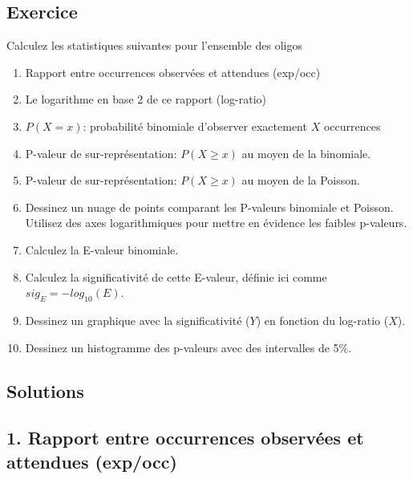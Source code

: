 \documentclass[]{article}
\newenvironment{Shaded}{\begin{snugshade}}{\end{snugshade}}
\newcommand{\StringTok}[1]{\textcolor[rgb]{0.80,0.58,0.58}{#1}}
\newcommand{\OperatorTok}[1]{\textcolor[rgb]{0.94,0.94,0.82}{#1}}
\newcommand{\NormalTok}[1]{\textcolor[rgb]{0.80,0.80,0.80}{#1}}
\begin{document}
\subsection{Exercice}\label{exercice-1}

Calculez les statistiques suivantes pour l'ensemble des oligos

\begin{enumerate}
\def\labelenumi{\arabic{enumi}.}
\item
  Rapport entre occurrences observées et attendues (exp/occ)
\item
  Le logarithme en base 2 de ce rapport (log-ratio)
\item
  \(P(X= x)\): probabilité binomiale d'observer exactement \(X\)
  occurrences
\item
  P-valeur de sur-représentation: \(P(X \ge x)\) au moyen de la
  binomiale.
\item
  P-valeur de sur-représentation: \(P(X \ge x)\) au moyen de la Poisson.
\item
  Dessinez un nuage de points comparant les P-valeurs binomiale et
  Poisson. Utilisez des axes logarithmiques pour mettre en évidence les
  faibles p-valeurs.
\item
  Calculez la E-valeur binomiale.
\item
  Calculez la significativité de cette E-valeur, définie ici comme
  \(sig_{E} = -log_{10}(E)\).
\item
  Dessinez un graphique avec la significativité (\(Y\)) en fonction du
  log-ratio (\(X\)).
\item
  Dessinez un histogramme des p-valeurs avec des intervalles de 5\%.
\end{enumerate}

\subsection{Solutions}\label{solutions}

\subsection{1. Rapport entre occurrences observées et attendues
(exp/occ)}\label{rapport-entre-occurrences-observees-et-attendues-expocc}

\begin{Shaded}
\end{Shaded}
\end{document}
